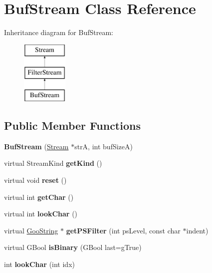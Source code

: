 \hypertarget{class_buf_stream}{}\section{Buf\+Stream Class Reference}
\label{class_buf_stream}
Inheritance diagram for Buf\+Stream\+:\begin{figure}[H]
\begin{center}
\leavevmode
\includegraphics[height=3.000000cm]{class_buf_stream}
\end{center}
\end{figure}
\subsection*{Public Member Functions}
\begin{DoxyCompactItemize}
\item 
\mbox{\label{class_buf_stream_a603cf69233c3f59d35a8c9dc3197778a}} 
{\bfseries Buf\+Stream} (\hyperlink{class_stream}{Stream} $\ast$strA, int buf\+SizeA)
\item 
\mbox{\label{class_buf_stream_a7f638a41529f0de2931c96890cbb5fc7}} 
virtual Stream\+Kind {\bfseries get\+Kind} ()
\item 
\mbox{\label{class_buf_stream_a55b68ba0d9ce91631346630b7c8ec066}} 
virtual void {\bfseries reset} ()
\item 
\mbox{\label{class_buf_stream_a725d2db7292e4ab63b7f811f99baf36b}} 
virtual int {\bfseries get\+Char} ()
\item 
\mbox{\label{class_buf_stream_a06037ce32aebe727b4d036141a18243a}} 
virtual int {\bfseries look\+Char} ()
\item 
\mbox{\label{class_buf_stream_ae7d5964f61285a87aef3416f17617641}} 
virtual \hyperlink{class_goo_string}{Goo\+String} $\ast$ {\bfseries get\+P\+S\+Filter} (int ps\+Level, const char $\ast$indent)
\item 
\mbox{\label{class_buf_stream_a67bc5c7dda3d0da9d4bd75302dc45e61}} 
virtual G\+Bool {\bfseries is\+Binary} (G\+Bool last=g\+True)
\item 
\mbox{\label{class_buf_stream_aed2695be64973d7d80aa7a8238ce70e1}} 
int {\bfseries look\+Char} (int idx)
\end{DoxyCompactItemize}

